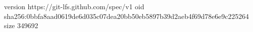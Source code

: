 version https://git-lfs.github.com/spec/v1
oid sha256:0bbfa8aad0619de6d035c07dea20bb50eb5897b39d2aeb4f69d78e6e9c225264
size 349692
